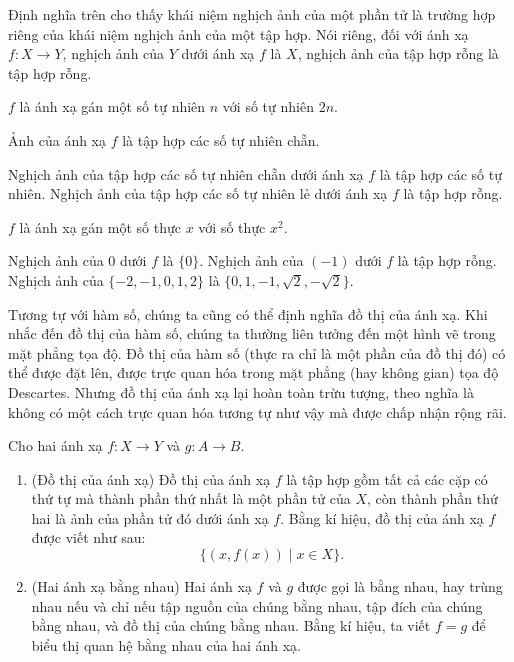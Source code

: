 Định nghĩa trên cho thấy khái niệm nghịch ảnh của một phần tử là trường hợp riêng của khái niệm nghịch ảnh của một tập hợp. Nói riêng, đối với ánh xạ $f: X\to Y$, nghịch ảnh của $Y$ dưới ánh xạ $f$ là $X$, nghịch ảnh của tập hợp rỗng là tập hợp rỗng.

\begin{example}
    $f$ là ánh xạ gán một số tự nhiên $n$ với số tự nhiên $2n$.

    \noindent Ảnh của ánh xạ $f$ là tập hợp các số tự nhiên chẵn.

    \noindent Nghịch ảnh của tập hợp các số tự nhiên chẵn dưới ánh xạ $f$ là tập hợp các số tự nhiên. Nghịch ảnh của tập hợp các số tự nhiên lẻ dưới ánh xạ $f$ là tập hợp rỗng.
\end{example}

\begin{example}
    $f$ là ánh xạ gán một số thực $x$ với số thực $x^{2}$.

    \noindent Nghịch ảnh của $0$ dưới $f$ là $\{ 0 \}$. Nghịch ảnh của $(-1)$ dưới $f$ là tập hợp rỗng. Nghịch ảnh của $\{ -2, -1, 0, 1, 2 \}$ là $\{ 0, 1, -1, \sqrt{2}, -\sqrt{2} \}$.
\end{example}

Tương tự với hàm số, chúng ta cũng có thể định nghĩa đồ thị của ánh xạ. Khi nhắc đến đồ thị của hàm số, chúng ta thường liên tưởng đến một hình vẽ trong mặt phẳng tọa độ. Đồ thị của hàm số (thực ra chỉ là một phần của đồ thị đó) có thể được đặt lên, được trực quan hóa trong mặt phẳng (hay không gian) tọa độ Descartes. Nhưng đồ thị của ánh xạ lại hoàn toàn trừu tượng, theo nghĩa là không có một cách trực quan hóa tương tự như vậy mà được chấp nhận rộng rãi.

\begin{definition}
    Cho hai ánh xạ $f: X\to Y$ và $g: A\to B$.
    \begin{enumerate}[label={(\roman*)}]
        \item (Đồ thị của ánh xạ) Đồ thị của ánh xạ $f$ là tập hợp gồm tất cả các cặp có thứ tự mà thành phần thứ nhất là một phần tử của $X$, còn thành phần thứ hai là ảnh của phần tử đó dưới ánh xạ $f$. Bằng kí hiệu, đồ thị của ánh xạ $f$ được viết như sau:
              \[
                  \{ (x,f(x)) \mid x\in X \}.
              \]
        \item (Hai ánh xạ bằng nhau) Hai ánh xạ $f$ và $g$ được gọi là bằng nhau, hay trùng nhau nếu và chỉ nếu tập nguồn của chúng bằng nhau, tập đích của chúng bằng nhau, và đồ thị của chúng bằng nhau. Bằng kí hiệu, ta viết $f = g$ để biểu thị quan hệ bằng nhau của hai ánh xạ.
    \end{enumerate}
\end{definition}

